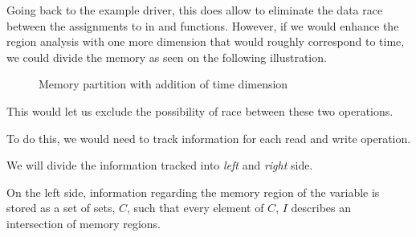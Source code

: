 \documentclass[..thesis.tex]{subfiles}
\newcommand{\opacity}{0.8}
\newcommand{\drawcube}[7]
{
      \filldraw[opacity=\opacity, #7, draw=black, dashed, xzp=#2] (#1,#3) rectangle (#4,#6);
      \filldraw[opacity=\opacity, #7, draw=black, dashed, xzp=#5] (#1,#3) rectangle (#4,#6);
      \filldraw[opacity=\opacity, #7, draw=black, dashed, xyp=#3] (#1,#2) rectangle (#4,#5);
      \filldraw[opacity=\opacity, #7, draw=black, dashed, xyp=#6] (#1,#2) rectangle (#4,#5);
      \filldraw[opacity=\opacity, #7, draw=black, dashed, yzp=#4] (#2,#3) rectangle (#5,#6);
}
\newcommand{\drawcubeoverz}[5]
{
 \drawcube{#1}{#2}{0}{#3}{#4}{\cubez}{#5}
}
\newcommand{\drawoutercube}
{
      \draw[thick,-] (0,0,0) -- ++(\cubex,0,0) -- ++(0,0,\cubez) -- node [anchor = north] {$B$} ++(-0.5*\cubex,0,0) --  node [anchor = north] {$A$} ++(-0.5*\cubex,0,0)  --   ++(0,0,-\cubez);
      \draw[thick,-] (0,\cubey,0) -- ++(\cubex,0,0) -- ++(0,0,\cubez) -- ++(-\cubex,0,0) --   ++(0,0,-\cubez)  ;

      \draw[thick,-] (0,0,0) -- (0,\cubey,0);
      \draw[thick,-] (\cubex,0,0) -- (\cubex,\cubey,0);
      \draw[thick,-] (\cubex,0,\cubez) -- ++(0,\cubey,0);
      \draw[thick,-] (0,0,\cubez) -- (0,\cubey,\cubez);
}
\newcommand{\initColor}{red}
\newcommand{\initLColor}{\initColor!30}
\newcommand{\initRColor}{\initColor!75}
\newcommand{\postInitColor}{blue}
\newcommand{\postInitLColor}{\postInitColor!30}
\newcommand{\postInitRColor}{\postInitColor!75}
\begin{document}
Going back to the example driver, this does allow to eliminate the data race between the assignments to  in  and  functions.
However, if we would enhance the region analysis with one more dimension that would roughly correspond to time,
we could divide the memory as seen on the following illustration. 

\begin{figure}[H]
  \centering
    \caption{Memory partition with addition of time dimension}
\end{figure}

This would let us exclude the possibility of race between these two operations. 


To do this, we would need to track information for each read and write operation.


We will divide the information tracked into \textit{left} and \textit{right} side. 

On the left side, information regarding the memory region of the variable is stored as a set of sets, $C$,
 such that every element of $C$, $I$ describes an intersection of memory regions.
\end{document}
